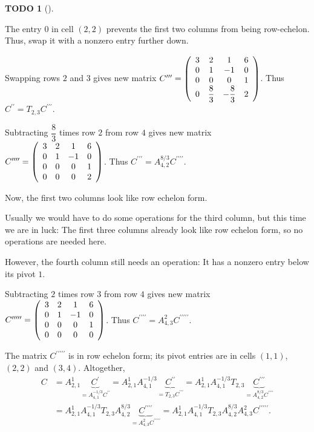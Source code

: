 \documentclass[numbers=enddot,12pt,final,onecolumn,notitlepage]{scrartcl}%
\theoremstyle{definition}
\newtheorem{quest}[theo]{TODO}
\newenvironment{todo}[1][]
{\begin{quest}[#1]\begin{leftbar}}
{\end{leftbar}\end{quest}}
\begin{document}
\begin{todo}
The entry $0$ in cell $\left(  2,2\right)  $ prevents the first two columns
from being row-echelon. Thus, swap it with a nonzero entry further down.

Swapping rows $2$ and $3$ gives new matrix $C^{\prime\prime\prime}=\left(
\begin{array}
[c]{cccc}%
3 & 2 & 1 & 6\\
0 & 1 & -1 & 0\\
0 & 0 & 0 & 1\\
0 & \dfrac{8}{3} & -\dfrac{8}{3} & 2
\end{array}
\right)  $. Thus $C^{\prime\prime}=T_{2,3}C^{\prime\prime\prime}$.

Subtracting $\dfrac{8}{3}$ times row $2$ from row $4$ gives new matrix
$C^{\prime\prime\prime\prime}=\left(
\begin{array}
[c]{cccc}%
3 & 2 & 1 & 6\\
0 & 1 & -1 & 0\\
0 & 0 & 0 & 1\\
0 & 0 & 0 & 2
\end{array}
\right)  $. Thus $C^{\prime\prime\prime}=A_{4,2}^{8/3}C^{\prime\prime
\prime\prime}$.

Now, the first two columns look like row echelon form.

Usually we would have to do some operations for the third column, but this
time we are in luck: The first three columns already look like row echelon
form, so no operations are needed here.

However, the fourth column still needs an operation: It has a nonzero entry
below its pivot $1$.

Subtracting $2$ times row $3$ from row $4$ gives new matrix $C^{\prime
\prime\prime\prime\prime}=\left(
\begin{array}
[c]{cccc}%
3 & 2 & 1 & 6\\
0 & 1 & -1 & 0\\
0 & 0 & 0 & 1\\
0 & 0 & 0 & 0
\end{array}
\right)  $. Thus $C^{\prime\prime\prime\prime}=A_{4,3}^{2}C^{\prime
\prime\prime\prime\prime}$.

The matrix $C^{\prime\prime\prime\prime\prime}$ is in row echelon form; its
pivot entries are in cells $\left(  1,1\right)  $, $\left(  2,2\right)  $ and
$\left(  3,4\right)  $. Altogether,%
\begin{align*}
C  &  =A_{2,1}^{1}\underbrace{C^{\prime}}_{=A_{4,1}^{-1/3}C^{\prime\prime}%
}=A_{2,1}^{1}A_{4,1}^{-1/3}\underbrace{C^{\prime\prime}}_{=T_{2,3}%
C^{\prime\prime\prime}}=A_{2,1}^{1}A_{4,1}^{-1/3}T_{2,3}\underbrace{C^{\prime
\prime\prime}}_{=A_{4,2}^{8/3}C^{\prime\prime\prime\prime}}\\
&  =A_{2,1}^{1}A_{4,1}^{-1/3}T_{2,3}A_{4,2}^{8/3}\underbrace{C^{\prime
\prime\prime\prime}}_{=A_{4,3}^{2}C^{\prime\prime\prime\prime\prime}}%
=A_{2,1}^{1}A_{4,1}^{-1/3}T_{2,3}A_{4,2}^{8/3}A_{4,3}^{2}C^{\prime\prime
\prime\prime\prime}.
\end{align*}



\end{todo}
\end{document}
